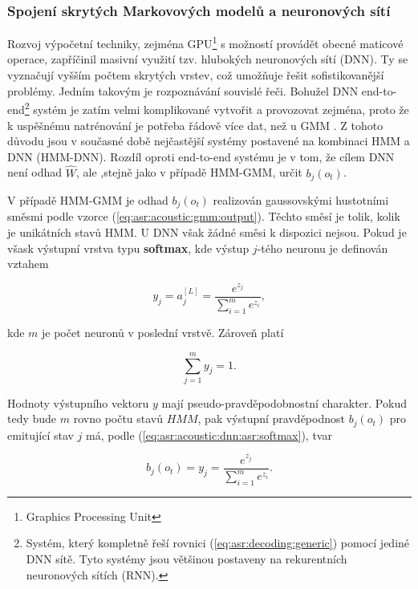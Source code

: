 \subsubsection{Spojení skrytých Markovových modelů a neuronových sítí}

Rozvoj výpočetní techniky, zejména GPU\footnote{Graphics Processing Unit} s možností provádět obecné maticové operace, zapříčinil masivní využití tzv. hlubokých neuronových sítí (DNN). Ty se vyznačují vyšším počtem skrytých vrstev, což umožňuje řešit sofistikovanější problémy. Jedním takovým je rozpoznávání souvislé řeči. Bohužel DNN end-to-end\footnote{Systém, který kompletně řeší rovnici (\ref{eq:asr:decoding:generic}) pomocí jediné DNN sítě. Tyto systémy jsou většinou postaveny na rekurentních neuronových sítích (RNN).} systém je zatím velmi komplikované vytvořit a provozovat zejména, proto že k uspěšnému natrénování je potřeba řádově více dat, než u GMM \cite{Amodei2016}. Z tohoto důvodu jsou v současné době nejčastější systémy postavené na kombinaci HMM a DNN (HMM-DNN). Rozdíl oproti end-to-end systému je v tom, že cílem DNN není odhad $\hat{W}$, ale ,stejně jako v případě HMM-GMM, určit $b_j\left(o_t\right)$.

V případě HMM-GMM je odhad $b_j\left(o_t\right)$ realizován gaussovskými hustotními směsmi podle vzorce (\ref{eq:asr:acoustic:gmm:output}). Těchto směsí je tolik, kolik je unikátních stavů HMM. U DNN však žádné směsi k dispozici nejsou. Pokud je všask výstupní vrstva typu \textbf{softmax}, kde výstup $j$-tého neuronu je definován vztahem

\begin{equation}
  y_{j} = a_{j}^{[L]} = \frac{e^{z_j}}{\sum_{i=1}^{m}e^{z_i}},
  \label{eq:asr:acoustic:dnn:asr:softmax}
\end{equation}

\noindent kde $m$ je počet neuronů v poslední vrstvě. Zároveň platí

\begin{equation}
  \sum_{j=1}^{m} y_{j} = 1.
  \label{eq:asr:acoustic:dnn:asr:softmax:criterium}
\end{equation}

\noindent Hodnoty výstupního vektoru $y$ mají pseudo-pravděpodobnostní charakter. Pokud tedy bude $m$ rovno počtu stavů $HMM$, pak výstupní pravděpodnost $b_{j} \left(o_t\right)$ pro emitující stav $j$ má, podle (\ref{eq:asr:acoustic:dnn:asr:softmax}), tvar

\begin{equation}
  b_{j} \left(o_t\right) = y_{j} = \frac{e^{z_j}}{\sum_{i=1}^{m}e^{z_i}}.
  \label{eq:asr:acoustic:dnn:asr:softmax:criterium}
\end{equation}

